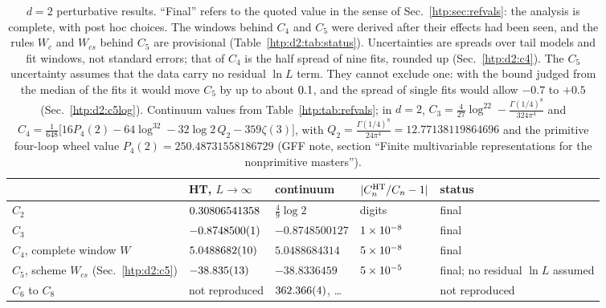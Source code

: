 \begin{table}[ht]
\centering\small
\begin{tabular}{@{}llllp{3.1cm}@{}}
\toprule
 & HT, $L\to\infty$ & continuum & $|C_n^{\rm HT}/C_n-1|$ & status \\\midrule
$C_2$ & $0.30806541358$ & $\frac49\log2$ & \HTpCtwoTwoDigits{} digits & final \\
$C_3$ & $-0.8748500(1)$ & $-0.8748500127$ & $1\times10^{-8}$ & final \\
$C_4$, complete window $W$ & $5.0488682(10)$ & $5.0488684314$ & $5\times10^{-8}$ & final \\
$C_5$, scheme $W_{cs}$ (Sec.~\ref{htp:d2:c5}) & $-38.835(13)$ & $-38.8336459$ & $5\times10^{-5}$ & final; no residual $\ln L$ assumed \\
$C_6$ to $C_8$ & not reproduced & $362.366(4)$, \dots & & not reproduced \\
\bottomrule
\end{tabular}
\caption{$d=2$ perturbative results. ``Final'' refers to the quoted value in the sense of Sec.~\ref{htp:sec:refvals}: the
analysis is complete, with post hoc choices. The windows behind $C_4$ and $C_5$ were derived after their effects had been
seen, and the rules $W_c$ and $W_{cs}$ behind $C_5$ are provisional (Table~\ref{htp:d2:tab:status}). Uncertainties are spreads
over tail models and fit windows, not standard errors; that of $C_4$ is the half spread of nine fits, rounded up
(Sec.~\ref{htp:d2:c4}).
The $C_5$ uncertainty assumes that the data carry no residual $\ln L$ term. They cannot exclude one: with the bound
judged from the median of the fits it would move $C_5$ by up to about $0.1$, and the spread of single fits
would allow $-0.7$ to $+0.5$ (Sec.~\ref{htp:d2:c5log}). Continuum values from Table~\ref{htp:tab:refvals}; in $d=2$,
$C_3=\frac4{27}\log^22-\frac{\Gamma(1/4)^8}{324\pi^4}$ and $C_4=\frac1{648}\big[16P_4(2)-64\log^32-32\log2\,Q_2-359\zeta(3)\big]$,
with $Q_2=\frac{\Gamma(1/4)^8}{24\pi^4}=12.77138119864696$ and the primitive four-loop wheel value $P_4(2)=250.48731558186729$
(GFF note, section ``Finite multivariable representations for the nonprimitive masters'').}
\label{htp:d2:tab:summary}
\end{table}

